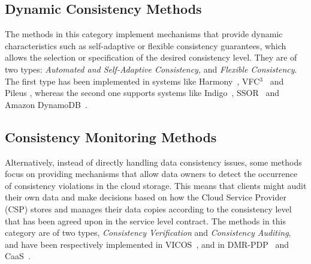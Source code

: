 \subsection{Dynamic Consistency Methods}

The methods in this category implement mechanisms that provide dynamic characteristics such as self-adaptive 
or flexible consistency guarantees, which allows the selection or specification of the desired consistency level. 
They are of two types: \textit{Automated and Self-Adaptive Consistency,} and \textit{Flexible Consistency}. The first type has been implemented in systems like Harmony~\cite{chihoub2012harmony}, VFC$^3$~\cite{esteves2012quality} and Pileus \cite{Terry:2013}, whereas the second one supports systems like 
Indigo~\cite{balegas2015putting}, SSOR~\cite{Chen:2014} and Amazon DynamoDB~\cite{sivasubramanian2012amazon}. 
\vspace{3mm}

\subsection{Consistency Monitoring Methods}

Alternatively, instead of directly handling data consistency issues, some methods focus on providing mechanisms that allow data owners to detect the occurrence of consistency violations in the cloud storage. This means that 
clients might audit their own data and make decisions based on how the Cloud Service Provider (CSP) stores and manages their data copies according to the consistency level that has been agreed upon in  the service level contract. 
The methods in this category are of two types, \textit{Consistency Verification} and \textit{Consistency Auditing}, and have been respectively implemented in VICOS~\cite{BrandenburgerCK15}, and in DMR-PDP~\cite{MukundanML12} and CaaS~\cite{liu2014consistency}.
\vspace{3mm}

